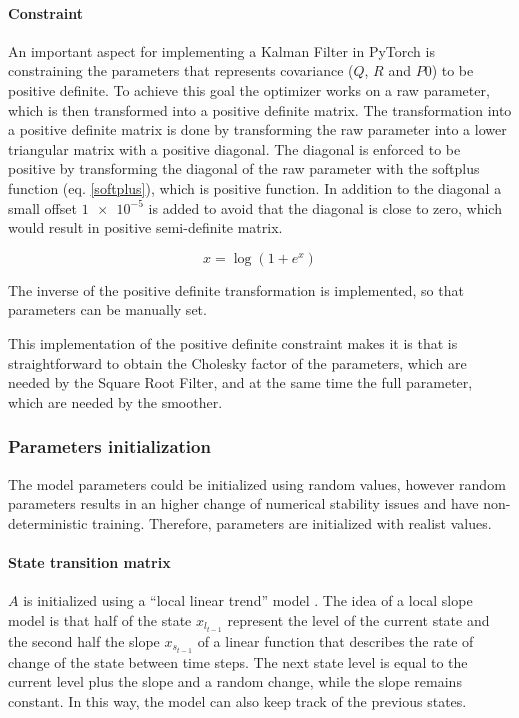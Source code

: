 \documentclass{article}
\begin{document}
\paragraph{Constraint}

An important aspect for implementing a Kalman Filter in PyTorch is constraining the parameters that represents covariance ($Q$, $R$ and $P0$) to be positive definite. To achieve this goal the optimizer works on a raw parameter, which is then transformed into a positive definite matrix.
The transformation into a positive definite matrix is done by transforming the raw parameter into a lower triangular matrix with a positive diagonal. The diagonal is enforced to be positive by transforming the diagonal of the raw parameter with the softplus function (eq. \ref{softplus}), which is positive function. In addition to the diagonal a small offset $\num{1e-5}$ is added to avoid that the diagonal is close to zero, which would result in positive semi-definite matrix.

\begin{equation}\label{softplus}
    x = \log (1 + e^{x})
\end{equation}

The inverse of the positive definite transformation is implemented, so that parameters can be manually set.

This implementation of the positive definite constraint makes it is that is straightforward to obtain the Cholesky factor of the parameters, which are needed by the Square Root Filter, and at the same time the full parameter, which are needed by the smoother.

\subsubsection{Parameters initialization}

The model parameters could be initialized using random values, however random parameters results in an higher change of numerical stability issues and have non-deterministic training. Therefore, parameters are initialized with realist values.

\paragraph{State transition matrix} $A$ is initialized using a ``local linear trend'' model \cite{durbin_time_2012}. The idea of a local slope model is that half of the state $x_{l_{t-1}}$ represent the level of the current state and the second half the slope $x_{s_{t-1}}$ of a linear function that describes the rate of change of the state between time steps. The next state level is equal to the current level plus the slope and a random change, while the slope remains constant. In this way, the model can also keep track of the previous states.
\end{document}
